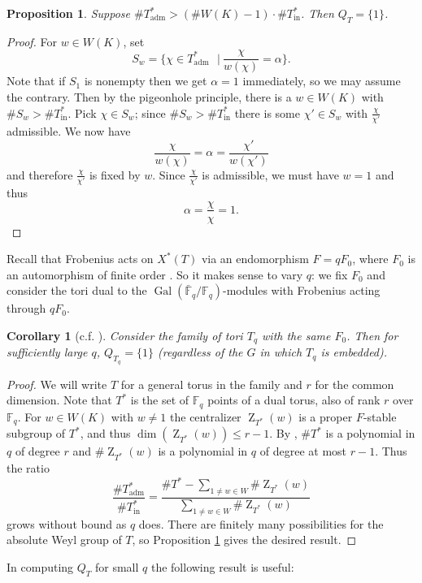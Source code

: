 \documentclass{compositio}
\theoremstyle{plain}
\newtheorem{proposition}[theorem]{Proposition}
\newtheorem{corollary}[theorem]{Corollary}
\theoremstyle{definition}
\DeclareMathOperator{\Gal}{Gal}
\DeclareMathOperator{\Z}{Z}
\newcommand{\Fq}{\mathbb{F}_q}
\newcommand{\Fqb}{\bar{\mathbb{F}}_q}
\newcommand{\st}{\ensuremath{\ \ \ \vert\ }}
\newcommand{\Thadm}{T^*_{\operatorname{adm}}}
\newcommand{\Thinadm}{T^*_{\operatorname{in}}}
\newcommand{\hatT}{T^*}
\begin{document}
\begin{proposition} \label{pigeonhole}
Suppose $\#\Thadm > (\# W(K) - 1) \cdot \# \Thinadm$.  Then $Q_T = \{ 1 \}$.
\end{proposition}
\begin{proof}
For $w \in W(K)$, set
$$S_w = \{\chi \in \Thadm \st  \frac{\chi}{w(\chi)} = \alpha\}.$$
Note that if $S_1$ is nonempty then we get $\alpha = 1$ immediately, so we may
assume the contrary.  Then by the pigeonhole principle, there is a $w \in W(K)$
with $\# S_w > \# \Thinadm$.  Pick $\chi \in S_w$; since $\# S_w > \#\Thinadm$
there is some $\chi' \in S_w$ with $\frac{\chi}{\chi'}$ admissible.  We now have
$$\frac{\chi}{w(\chi)} = \alpha = \frac{\chi'}{w(\chi')}$$
and therefore $\frac{\chi}{\chi'}$ is fixed by $w$.  Since $\frac{\chi}{\chi'}$ is admissible, we must have $w = 1$ and thus
$$\alpha = \frac{\chi}{\chi} = 1.$$
\end{proof}

Recall that Frobenius acts on $X^*(T)$ via an endomorphism $F = qF_0$, where
$F_0$ is an automorphism of finite order \cite[p. 82]{carter:93a}.  So it makes sense
to vary $q$: we fix $F_0$ and consider the tori dual to the $\Gal(\Fqb/\Fq)$-modules
with Frobenius acting through $qF_0$.

\begin{corollary}[{c.f. \cite[Lemma 8.4.2]{carter:93a}}]
Consider the family of tori $T_q$ with the same $F_0$.  Then for sufficiently large $q$,
$Q_{T_q} = \{ 1 \}$ (regardless of the $G$ in which $T_q$ is embedded).
\end{corollary}
\begin{proof}
We will write $T$ for a general torus in the family and $r$ for the common dimension.
Note that $\hatT$ is the set of $\Fq$ points of a dual torus, also of rank $r$ over $\Fq$.
For $w \in W(K)$ with $w \ne 1$ the centralizer $\Z_{\hatT}(w)$ is a proper $F$-stable
subgroup of $\hatT$, and thus $\dim(\Z_{\hatT}(w)) \le r - 1$.  By \cite[3.3.5]{carter:93a},
$\# \hatT$ is a polynomial in $q$ of degree $r$ and $\# \Z_{\hatT}(w)$ is a polynomial
in $q$ of degree at most $r-1$.  Thus the ratio
$$\frac{\# \Thadm}{\# \Thinadm} = \frac{\# \hatT - \sum_{1 \ne w \in W} \# \Z_{\hatT}(w)}{\sum_{1 \ne w \in W} \# \Z_{\hatT}(w)}$$
grows without bound as $q$ does.  There are finitely many possibilities for the absolute
Weyl group of $T$, so Proposition \ref{pigeonhole} gives the desired result.
\end{proof}

In computing $Q_T$ for small $q$ the following result is useful:
\end{document}
